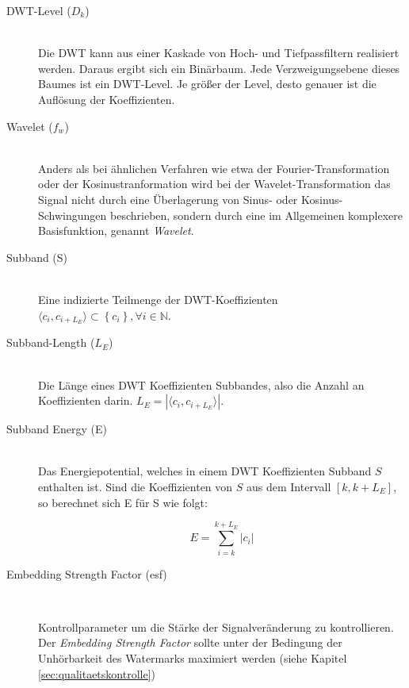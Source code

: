 \begin{description}
\item[DWT-Level (${D}_{k}$)] \hfill \\

Die DWT kann aus einer Kaskade von Hoch- und Tiefpassfiltern realisiert werden. Daraus ergibt sich ein Binärbaum. Jede Verzweigungsebene dieses Baumes ist ein DWT-Level. Je größer der Level, desto genauer ist die Auflösung der Koeffizienten. 

\item[Wavelet (${f}_{w}$)] \hfill \\
Anders als bei \"ahnlichen Verfahren wie etwa der Fourier-\-Transformation oder der Kosinus\-tranformation wird bei der Wavelet-Transformation das Signal nicht durch eine Überlagerung von Sinus- oder Kosinus-Schwingungen beschrieben, sondern durch eine im Allgemeinen komplexere Basisfunktion, genannt \textit{Wavelet}.
	
\item[Subband (S)] \hfill \\ 
Eine indizierte Teilmenge der DWT-Koeffizienten $\langle{c}_{i},{c}_{i+{L}_{E}}\rangle \subset \left\{{c}_{i}\right\}, \forall i \in \mathbb{N}$. 
	
\item[Subband-Length (${L}_{E}$)] \hfill \\ 
Die L\"ange eines DWT Koeffizienten Subbandes, also die Anzahl an Koeffizienten darin. ${L}_{E} = |\langle{c}_{i},{c}_{i+{L}_{E}}\rangle|$.

\item[Subband Energy (E)] \hfill \\
Das Energiepotential, welches in einem DWT Koeffizienten Subband $S$ enthalten ist. Sind die Koeffizienten von $S$ aus dem Intervall $[k, k+{L}_{E}]$, so berechnet sich E f\"ur S wie folgt:
	
	\begin{equation}
		E = \sum\limits_{i=k}^{k+{L}_{E}}|c_i| \label{equ:energy}
	\end{equation}
	
\item[Embedding Strength Factor (esf)] \hfill \\ 

Kontrollparameter um die Stärke der Signalveränderung zu kontrollieren. Der \textit{Embedding Strength Factor} sollte unter der Bedingung der Unhörbarkeit des Watermarks maximiert werden (siehe Kapitel \ref{sec:qualitaetskontrolle})
	

\end{description}
